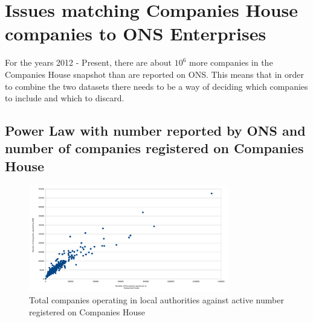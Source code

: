 \documentclass[a4paper,10pt]{article}
\begin{document}
\section{Issues matching Companies House companies to ONS Enterprises}
For the years 2012 - Present, there are about $10^6$ more companies in the Companies House snapshot than are reported on ONS. This means that in order to combine the two datasets there needs to be a way of deciding which companies to include and which to discard.
\subsection{Power Law with number reported by ONS and number of companies registered on Companies House}
\begin{figure}[ht]

\includegraphics[width=330px]{graphics/2017_ons_against_ch}
\caption{Total companies operating in local authorities against active number registered on Companies House}
\end{figure}
\end{document}
